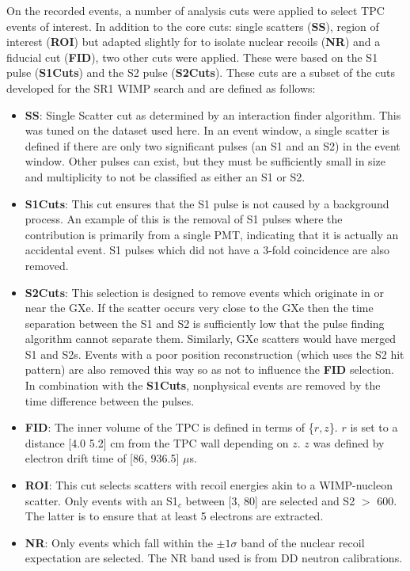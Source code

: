 \par
On the recorded events, a number of analysis cuts were applied to select TPC events of interest.
In addition to the core cuts: single scatters (\textbf{SS}), region of interest (\textbf{ROI}) but adapted slightly for to isolate nuclear recoils (\textbf{NR}) and a fiducial cut (\textbf{FID}), two other cuts were applied.
These were based on the S1 pulse (\textbf{S1Cuts}) and the S2 pulse (\textbf{S2Cuts}).
These cuts are a subset of the cuts developed for the SR1 WIMP search \cite{lz_ws_sr1_ref} and are defined as follows:
\begin{itemize}
    \item \textbf{SS}: Single Scatter cut as determined by an interaction finder algorithm. This was tuned on the dataset used here. In an event window, a single scatter is defined if there are only two significant pulses (an S1 and an S2) in the event window. Other pulses can exist, but they must be sufficiently small in size and multiplicity to not be classified as either an S1 or S2.
    \item \textbf{S1Cuts}: This cut ensures that the S1 pulse is not caused by a background process. An example of this is the removal of S1 pulses where the contribution is primarily from a single PMT, indicating that it is actually an accidental event. S1 pulses which did not have a 3-fold coincidence are also removed.
    \item \textbf{S2Cuts}: This selection is designed to remove events which originate in or near the GXe. If the scatter occurs very close to the GXe then the time separation between the S1 and S2 is sufficiently low that the pulse finding algorithm cannot separate them. Similarly, GXe scatters would have merged S1 and S2s. Events with a poor position reconstruction (which uses the S2 hit pattern) are also removed this way so as not to influence the \textbf{FID} selection. In combination with the \textbf{S1Cuts}, nonphysical events are removed by the time difference between the pulses.
    \item \textbf{FID}: The inner volume of the TPC is defined in terms of \{$r,z$\}. $r$ is set to a distance [4.0 5.2] cm from the TPC wall depending on $z$. $z$ was defined by electron drift time of [86, 936.5] $\mu$s.
    \item \textbf{ROI}: This cut selects scatters with recoil energies akin to a WIMP-nucleon scatter. Only events with an S1$_c$ between [3, 80] are selected and S2 $>$ 600. The latter is to ensure that at least 5 electrons are extracted.
    \item \textbf{NR}: Only events which fall within the $\pm 1\sigma$ band of the nuclear recoil expectation are selected. The NR band used is from DD neutron calibrations.
\end{itemize}
